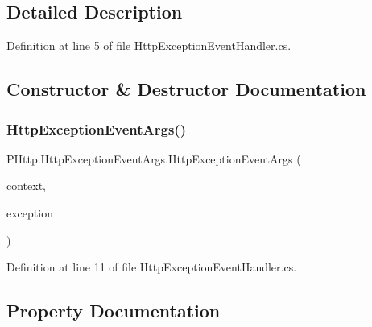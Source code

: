 \subsection{Detailed Description}


Definition at line 5 of file Http\+Exception\+Event\+Handler.\+cs.



\subsection{Constructor \& Destructor Documentation}
\mbox{\label{class_p_http_1_1_http_exception_event_args_a61091a6ef34edbed12cac6627392cf22}} 
\subsubsection{\texorpdfstring{Http\+Exception\+Event\+Args()}{HttpExceptionEventArgs()}}
{\footnotesize\ttfamily P\+Http.\+Http\+Exception\+Event\+Args.\+Http\+Exception\+Event\+Args (\begin{DoxyParamCaption}\item[{\hyperlink{class_p_http_1_1_http_context}{Http\+Context}}]{context,  }\item[{\hyperlink{class_p_http_1_1_http_exception_event_args_a33c91813b28c57dbbc37516c0d9df544}{Exception}}]{exception }\end{DoxyParamCaption})}



Definition at line 11 of file Http\+Exception\+Event\+Handler.\+cs.



\subsection{Property Documentation}
\mbox{\label{class_p_http_1_1_http_exception_event_args_a33c91813b28c57dbbc37516c0d9df544}} 
